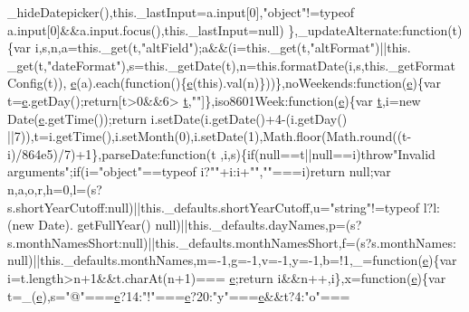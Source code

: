 \begin{DoxyCode}
      \_hideDatepicker(),this.\_lastInput=a.input[0],\textcolor{stringliteral}{"object"}!=typeof a.input[0]&&a.input.focus(),this.\_lastInput=null)
\},\_updateAlternate:function(t)\{var i,s,n,a=this.\_get(t,\textcolor{stringliteral}{"altField"});a&&(i=this.\_get(t,\textcolor{stringliteral}{"altFormat"})||this.
      \_get(t,\textcolor{stringliteral}{"dateFormat"}),s=this.\_getDate(t),n=this.formatDate(i,s,this.\_getFormatConfig(t)),
      \hyperlink{jquery-ui_8min_8js_a2c038346d47955cbe2cb91e338edd7e1}{e}(a).each(\textcolor{keyword}{function}()\{\hyperlink{jquery-ui_8min_8js_a2c038346d47955cbe2cb91e338edd7e1}{e}(\textcolor{keyword}{this}).val(n)\}))\},noWeekends:\textcolor{keyword}{function}(\hyperlink{jquery-ui_8min_8js_a2c038346d47955cbe2cb91e338edd7e1}{e})\{var t=\hyperlink{jquery-ui_8min_8js_a2c038346d47955cbe2cb91e338edd7e1}{e}.getDay();\textcolor{keywordflow}{return}[t>0&&6>
      \hyperlink{jquery-2_80_83_8min_8js_aaccc9105df5383111407fd5b41255e23}{t},\textcolor{stringliteral}{""}]\},iso8601Week:\textcolor{keyword}{function}(\hyperlink{jquery-ui_8min_8js_a2c038346d47955cbe2cb91e338edd7e1}{e})\{var \hyperlink{jquery-2_80_83_8min_8js_aaccc9105df5383111407fd5b41255e23}{t},i=\textcolor{keyword}{new} Date(\hyperlink{jquery-ui_8min_8js_a2c038346d47955cbe2cb91e338edd7e1}{e}.getTime());\textcolor{keywordflow}{return} i.setDate(i.getDate()+4-(i.getDay()
      ||7)),t=i.getTime(),i.setMonth(0),i.setDate(1),Math.floor(Math.round((t-i)/864e5)/7)+1\},parseDate:\textcolor{keyword}{function}(t
      ,i,s)\{\textcolor{keywordflow}{if}(null==t||null==i)\textcolor{keywordflow}{throw}\textcolor{stringliteral}{"Invalid arguments"};\textcolor{keywordflow}{if}(i=\textcolor{stringliteral}{"object"}==typeof i?\textcolor{stringliteral}{""}+i:i+\textcolor{stringliteral}{""},\textcolor{stringliteral}{""}===i)\textcolor{keywordflow}{return} null;var 
      n,a,o,r,h=0,l=(s?s.shortYearCutoff:null)||this.\_defaults.shortYearCutoff,u=\textcolor{stringliteral}{"string"}!=typeof l?l:(\textcolor{keyword}{new} Date).
      getFullYear()%
      null)||this.\_defaults.dayNames,p=(s?s.monthNamesShort:null)||this.\_defaults.monthNamesShort,f=(s?s.monthNames:
      null)||this.\_defaults.monthNames,m=-1,g=-1,v=-1,y=-1,b=!1,\_=\textcolor{keyword}{function}(\hyperlink{jquery-ui_8min_8js_a2c038346d47955cbe2cb91e338edd7e1}{e})\{var i=t.length>n+1&&t.charAt(n+1)===
      \hyperlink{jquery-ui_8min_8js_a2c038346d47955cbe2cb91e338edd7e1}{e};\textcolor{keywordflow}{return} i&&n++,i\},x=\textcolor{keyword}{function}(\hyperlink{jquery-ui_8min_8js_a2c038346d47955cbe2cb91e338edd7e1}{e})\{var t=\_(\hyperlink{jquery-ui_8min_8js_a2c038346d47955cbe2cb91e338edd7e1}{e}),s=\textcolor{stringliteral}{"@"}===\hyperlink{jquery-ui_8min_8js_a2c038346d47955cbe2cb91e338edd7e1}{e}?14:\textcolor{stringliteral}{"!"}===\hyperlink{jquery-ui_8min_8js_a2c038346d47955cbe2cb91e338edd7e1}{e}?20:\textcolor{stringliteral}{"y"}===\hyperlink{jquery-ui_8min_8js_a2c038346d47955cbe2cb91e338edd7e1}{e}&&t?4:\textcolor{stringliteral}{"o"}===

\end{DoxyCode}
